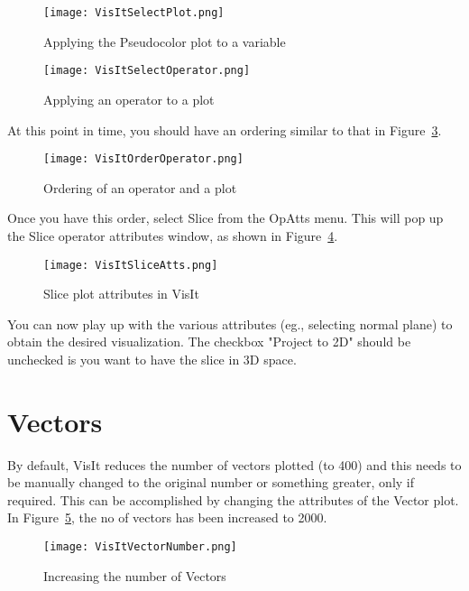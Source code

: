\begin{figure}
  \center
  \texttt{[image: VisItSelectPlot.png]}
  \caption{Applying the Pseudocolor plot to a variable}
  \label{VisItSelectPlot}
\end{figure}

\begin{figure}
  \center
  \texttt{[image: VisItSelectOperator.png]}
  \caption{Applying an operator to a plot}
  \label{VisItSelectOperator}
\end{figure}

At this point in time, you should have an ordering similar to that in Figure~\ref{VisItOrderOperator}.  

\begin{figure}
  \center
  \texttt{[image: VisItOrderOperator.png]}
  \caption{Ordering of an operator and a plot}
  \label{VisItOrderOperator}
\end{figure}

Once you have this order, select Slice from the OpAtts menu. This will pop up the Slice operator attributes window, as shown in Figure~\ref{VisItSliceAtts}.

\begin{figure}
  \center
  \texttt{[image: VisItSliceAtts.png]}
  \caption{Slice plot attributes in VisIt}
  \label{VisItSliceAtts}
\end{figure}

You can now play up with the various attributes (eg., selecting normal plane) to obtain the desired visualization. The checkbox "Project to 2D" should be unchecked is you want to have the slice in 3D space.

\section{Vectors}

By default, VisIt reduces the number of vectors plotted (to 400) and this needs to be manually changed to the original number or something greater, only if required.
This can be accomplished by changing the attributes of the Vector plot. In Figure~\ref{VisItVectorNumber}, the no of vectors has been increased to 2000.

\begin{figure}
  \center
  \texttt{[image: VisItVectorNumber.png]}
  \caption{Increasing the number of Vectors}
  \label{VisItVectorNumber}
\end{figure}

